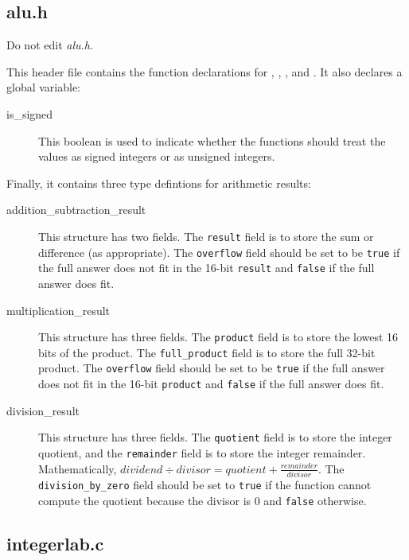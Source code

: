 \subsection{alu.h}

Do not edit \textit{alu.h}.

This header file contains the function declarations for ,
, , and .  It also
declares a global variable:
\begin{description}
\item[is\_signed] This boolean is used to indicate whether the functions should
    treat the values as signed integers or as unsigned integers.
\end{description}
Finally, it contains three type defintions for arithmetic results:
\begin{description}
\item[addition\_subtraction\_result] This structure has two fields. The
    \lstinline{result} field is to store the sum or difference (as
    appropriate). The \lstinline{overflow} field should be set to be
    \lstinline{true} if the full answer does not fit in the 16-bit
    \lstinline{result} and \lstinline{false} if the full answer does fit.
\item[multiplication\_result] This structure has three fields. The
    \lstinline{product} field is to store the lowest 16 bits of the product. The
    \lstinline{full_product} field is to store the full 32-bit product. The
    \lstinline{overflow} field should be set to be \lstinline{true} if the full
    answer does not fit in the 16-bit \lstinline{product} and \lstinline{false}
    if the full answer does fit.
\item[division\_result] This structure has three fields. The
    \lstinline{quotient} field is to store the integer quotient, and the
    \lstinline{remainder} field is to store the integer remainder.
    Mathematically, $dividend \div divisor = quotient +
    \frac{remainder}{divisor}$. The \lstinline{division_by_zero} field should
    be set to \texttt{true} if the  function cannot compute
    the quotient because the divisor is 0 and \lstinline{false} otherwise.
\end{description}

\subsection{integerlab.c}

